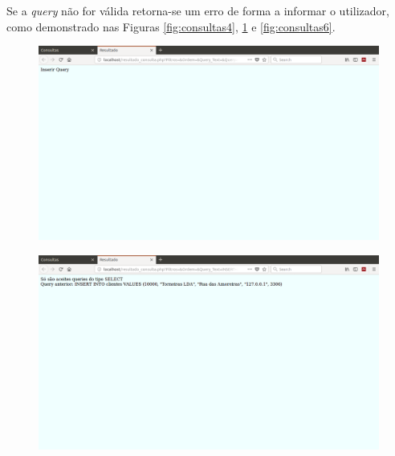 \documentclass[11pt,twoside,a4paper]{report}
\begin{document}
Se a \textit{query} não for válida retorna-se um erro de forma a informar o utilizador, como demonstrado nas Figuras \ref{fig:consultas4}, \ref{fig:consultas5} e \ref{fig:consultas6}.
\vspace{2cm}
\begin{figure}[H]
	\centering
	\begin{minipage}{1\textwidth}
		\begin{center}
			\includegraphics[trim={0 20cm 0 0},clip,width=1\textwidth]{consultas03} %
			\label{fig:consultas4}
		\end{center}
	\end{minipage}
	\begin{minipage}{1\textwidth}
		\begin{center}
			\includegraphics[trim={0 20cm 0 0},clip,width=1\textwidth]{consultas04} %
			\label{fig:consultas5}
		\end{center}
	\end{minipage}

\end{figure}
\end{document}
